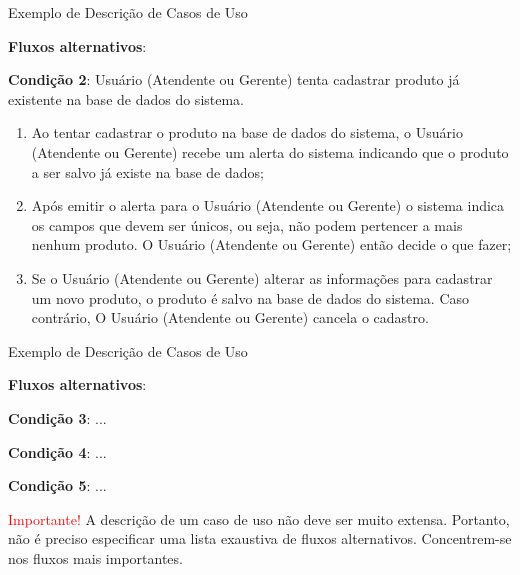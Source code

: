 \documentclass[xcolor=x11names,compress]{beamer}
\begin{document}
\begin{frame}{Exemplo de Descrição de Casos de Uso}

\textbf{Fluxos alternativos}:

\vspace*{2mm}

\textbf{Condição 2}: Usuário (Atendente ou Gerente) tenta cadastrar produto já existente na base de dados do sistema.

\begin{enumerate}

\item Ao tentar cadastrar o produto na base de dados do sistema, o Usuário (Atendente ou Gerente) recebe um alerta do sistema indicando que o produto a ser salvo já existe na base de dados;

\item Após emitir o alerta para o Usuário (Atendente ou Gerente) o sistema indica os campos que devem ser únicos, ou seja, não podem pertencer a mais nenhum produto. O Usuário (Atendente ou Gerente) então decide o que fazer;

\item Se o Usuário (Atendente ou Gerente) alterar as informações para cadastrar um novo produto, o produto é salvo na base de dados do sistema. Caso contrário, O Usuário (Atendente ou Gerente) cancela o cadastro.

\end{enumerate}

\end{frame}

\begin{frame}[allowframebreaks]{Exemplo de Descrição de Casos de Uso}

\textbf{Fluxos alternativos}:

\vspace*{5mm}

\textbf{Condição 3}: ...

\textbf{Condição 4}: ...

\textbf{Condição 5}: ...

\begin{alertblock}{\centering \textcolor{red}{Importante!}}
A descrição de um caso de uso não deve ser muito extensa. Portanto, não é preciso especificar uma lista exaustiva de fluxos alternativos. Concentrem-se nos fluxos mais importantes.
\end{alertblock}

\end{frame}
\end{document}
